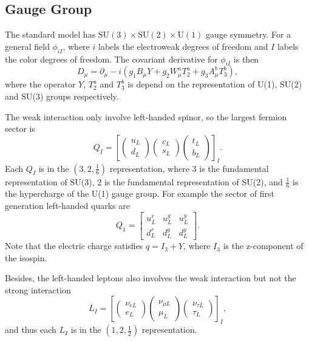 \subsection{Gauge Group}

The standard model has $\mathrm{SU(3)}\times\mathrm{SU(2)}\times\mathrm{U(1)}$ gauge symmetry.
For a general field $\phi_{iI}$, where $i$ labels the electroweak degrees of freedom and $I$ labels the color degrees of freedom.
The covariant derivative for $\phi_{iI}$ is then
\begin{equation}
	D_\mu = \partial_\mu -i \left(g_1 B_\mu Y + g_2 W^a_\mu T^a_{2} + g_3 A_\mu^b T^b_3                                                  \right),
\end{equation}
where the operator $Y$, $T_2^a$ and $T_3^b$ is depend on the representation of U(1), SU(2) and SU(3) groups respectively. 

The weak interaction only involve left-handed spinor, so the largest fermion sector is
\begin{equation}
	Q_I = \left[
		\begin{pmatrix} u_L \\ d_L \end{pmatrix} 
		\begin{pmatrix} c_L \\ s_L \end{pmatrix} 
		\begin{pmatrix} t_L \\ b_L \end{pmatrix}
	\right]_I.
\end{equation}
Each $Q_I$ is in the $\left(3,2,\frac{1}{6}\right)$ representation, where $3$ is the fundamental representation of SU(3), $2$ is the fundamental representation of SU(2), and $\frac{1}{6}$ is the hypercharge of the U(1) gauge group.
For example the sector of first generation left-handed quarks are
\begin{equation}
	Q_1 = \begin{bmatrix}
		u_L^r & u_L^g & u_L^y \\ d_L^r & d_L^g & d_L^y
	\end{bmatrix}.
\end{equation}
Note that the electric charge satisfies $q = I_3 + Y$, where $I_3$ is the z-component of the isospin.

Besides, the left-handed leptons also involves the weak interaction but not the strong interaction
\begin{equation}
	L_I = \left[
		\begin{pmatrix} \nu_{e L} \\ e_L \end{pmatrix} 
		\begin{pmatrix} \nu_{\mu L} \\ \mu_L \end{pmatrix} 
		\begin{pmatrix} \nu_{\tau L} \\ \tau_L \end{pmatrix}
	\right]_I,
\end{equation}
and thus each $L_I$ is in the $\left(1,2,\frac{1}{2}\right)$ representation.

